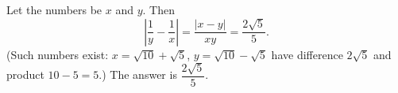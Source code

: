 Let the numbers be $x$ and $y$. Then
\[
\left|\dfrac{1}{y}-\dfrac{1}{x}\right|=\dfrac{|x-y|}{xy}=\dfrac{2\sqrt5}{5}.
\]
(Such numbers exist: $x=\sqrt{10}+\sqrt5$, $y=\sqrt{10}-\sqrt5$ have difference $2\sqrt5$ and product $10-5=5$.) The answer is $\boxed{\dfrac{2\sqrt5}{5}}$.
